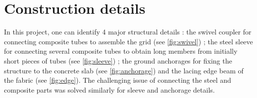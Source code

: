 



\pagebreak
\section{Construction details}\label{sec=construction_details}
In this project, one can identify 4 major structural details : the swivel coupler for connecting composite tubes to assemble the grid (see \cref{fig:swivel}) ; the steel sleeve for connecting several composite tubes to obtain long members from initially short pieces of tubes (see \cref{fig:sleeve}) ; the ground anchorages for fixing the structure to the concrete slab (see \cref{fig:anchorage}) and the lacing edge beam of the fabric (see \autoref{fig:edge}). The challenging issue of connecting the steel and composite parts was solved similarly for sleeve and anchorage details.

